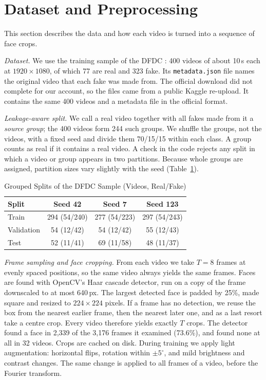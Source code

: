 \documentclass[conference]{IEEEtran}
\begin{document}
\section{Dataset and Preprocessing}

This section describes the data and how each video is turned into a sequence
of face crops.

\textit{Dataset.} We use the training sample of the DFDC
\cite{dolhansky2020dfdc}: 400 videos of about 10\,s each at
$1920\times1080$, of which 77 are real and 323 fake. Its
\texttt{metadata.json} file names the original video that each fake was made
from. The official download did not complete for our account, so the files
came from a public Kaggle re-upload. It contains the same 400 videos and a
metadata file in the official format.

\textit{Leakage-aware split.} We call a real video together with all fakes
made from it a \emph{source group}; the 400 videos form 244 such groups. We
shuffle the groups, not the videos, with a fixed seed and divide them 70/15/15
within each class. A group counts as real if it contains a real video. A check
in the code rejects any split in which a video or group appears in two
partitions. Because whole groups are assigned, partition sizes vary slightly
with the seed (Table~\ref{tab:split}).

\begin{table}[t]
\caption{Grouped Splits of the DFDC Sample (Videos, Real/Fake)}
\label{tab:split}
\centering
\footnotesize
\begin{tabular}{lccc}
\toprule
\textbf{Split} & \textbf{Seed 42} & \textbf{Seed 7} & \textbf{Seed 123} \\
\midrule
Train & 294 (54/240) & 277 (54/223) & 297 (54/243) \\
Validation & 54 (12/42) & 54 (12/42) & 55 (12/43) \\
Test & 52 (11/41) & 69 (11/58) & 48 (11/37) \\
\bottomrule
\end{tabular}
\end{table}

\textit{Frame sampling and face cropping.} From each video we take $T=8$
frames at evenly spaced positions, so the same video always yields the same
frames. Faces are found with OpenCV's Haar cascade detector, run on a copy of
the frame downscaled to at most 640\,px. The largest detected face is padded
by 25\%, made square and resized to $224\times224$ pixels. If a frame has no
detection, we reuse the box from the nearest earlier frame, then the nearest
later one, and as a last resort take a centre crop. Every video therefore
yields exactly $T$ crops. The detector found a face in 2{,}339 of the 3{,}176
frames it examined (73.6\%), and found none at all in 32 videos. Crops are
cached on disk. During training we apply light augmentation: horizontal
flips, rotation within $\pm5^\circ$, and mild brightness and contrast
changes. The same change is applied to all frames of a video, before the
Fourier transform.
\end{document}

